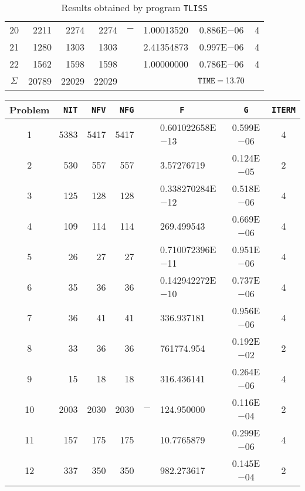\documentclass{esub2acm}
\begin{document}
\begin{table}
\begin{tabular}{c|rrrr@{}lcc}
20  &   2211    &   2274    &   2274    &   $-$ &   1.00013520  &   0.886E$-$06 &   4   \\
21  &   1280    &   1303    &   1303    &       &   2.41354873  &   0.997E$-$06 &   4   \\
22  &   1562    &   1598    &   1598    &       &   1.00000000  &   0.786E$-$06 &   4   \\ \hline
$\Sigma$\rule[-2pt]{0pt}{12pt}  &   20789   &   22029   &   22029   &       &       &   ${\tt TIME} = 13.70$    &       \\ \hline
\end{tabular}
\caption{Results obtained by program {\tt TLISS}}
\label{tliss}
\end{table}

\clearpage

\begin{table}
\footnotesize
\centering
\begin{tabular}{c|rrrr@{}lcc} \hline
Problem\rule[-2pt]{0pt}{12pt} & {\tt NIT} & {\tt NFV} & {\tt NFG} & \multicolumn{2}{c}{\tt F} & {\tt G} & {\tt ITERM} \\ \hline
1\rule[-2pt]{0pt}{12pt} &   5383    &   5417    &   5417    &       &   0.601022658E$-$13   &   0.599E$-$06 &   4   \\
2   &   530 &   557 &   557 &       &   3.57276719  &   0.124E$-$05 &   2   \\
3   &   125 &   128 &   128 &       &   0.338270284E$-$12   &   0.518E$-$06 &   4   \\
4   &   109 &   114 &   114 &       &   269.499543  &   0.669E$-$06 &   4   \\
5   &   26  &   27  &   27  &       &   0.710072396E$-$11   &   0.951E$-$06 &   4   \\
6   &   35  &   36  &   36  &       &   0.142942272E$-$10   &   0.737E$-$06 &   4   \\
7   &   36  &   41  &   41  &       &   336.937181  &   0.956E$-$06 &   4   \\
8   &   33  &   36  &   36  &       &   761774.954  &   0.192E$-$02 &   2   \\
9   &   15  &   18  &   18  &       &   316.436141  &   0.264E$-$06 &   4   \\
10  &   2003    &   2030    &   2030    &   $-$ &   124.950000  &   0.116E$-$04 &   2   \\
11  &   157 &   175 &   175 &       &   10.7765879  &   0.299E$-$06 &   4   \\
12  &   337 &   350 &   350 &       &   982.273617  &   0.145E$-$04 &   2   \\

\end{tabular}
\end{table}
\end{document}
